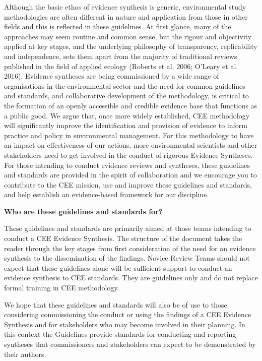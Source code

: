 \documentclass[
  letterpaper,
  DIV=11,
  numbers=noendperiod]{scrreprt}
\begin{document}
Although the basic ethos of evidence synthesis is generic, environmental
study methodologies are often different in nature and application from
those in other fields and this is reflected in these guidelines. At
first glance, many of the approaches may seem routine and common sense,
but the rigour and objectivity applied at key stages, and the underlying
philosophy of transparency, replicability and independence, sets them
apart from the majority of traditional reviews published in the field of
applied ecology (Roberts et al. 2006; O'Leary et al. 2016). Evidence
syntheses are being commissioned by a wide range of organisations in the
environmental sector and the need for common guidelines and standards,
and collaborative development of the methodology, is critical to the
formation of an openly accessible and credible evidence base that
functions as a public good. We argue that, once more widely established,
CEE methodology will significantly improve the identification and
provision of evidence to inform practice and policy in environmental
management. For this methodology to have an impact on effectiveness of
our actions, more environmental scientists and other stakeholders need
to get involved in the conduct of rigorous Evidence Syntheses. For those
intending to conduct evidence reviews and syntheses, these guidelines
and standards are provided in the spirit of collaboration and we
encourage you to contribute to the CEE mission, use and improve these
guidelines and standards, and help establish an evidence-based framework
for our discipline.

\textbf{Who are these guidelines and standards for?}

These guidelines and standards are primarily aimed at those teams
intending to conduct a CEE Evidence Synthesis. The structure of the
document takes the reader through the key stages from first
consideration of the need for an evidence synthesis to the dissemination
of the findings. Novice Review Teams should not expect that these
guidelines alone will be sufficient support to conduct an evidence
synthesis to CEE standards. They are guidelines only and do not replace
formal training in CEE methodology.

We hope that these guidelines and standards will also be of use to those
considering commissioning the conduct or using the findings of a CEE
Evidence Synthesis and for stakeholders who may become involved in their
planning. In this context the Guidelines provide standards for
conducting and reporting syntheses that commissioners and stakeholders
can expect to be demonstrated by their authors.
\end{document}
